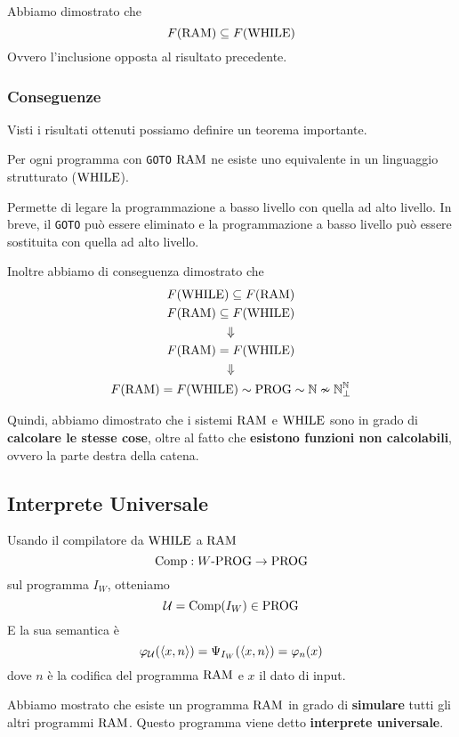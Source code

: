 Abbiamo dimostrato che
$$ F(\text{RAM}) \subseteq F(\text{WHILE}) $$
Ovvero l'inclusione opposta al risultato precedente.

\subsubsection{Conseguenze}

Visti i risultati ottenuti possiamo definire un teorema importante.\\

\begin{theor}
	Per ogni programma con \texttt{GOTO} $\text{RAM}$ ne esiste uno equivalente in un linguaggio strutturato ($\text{WHILE}$).
\end{theor}

Permette di legare la programmazione a basso livello con quella ad alto livello. In breve, il \texttt{GOTO} può essere eliminato e la programmazione a basso livello può essere sostituita con quella ad alto livello.

Inoltre abbiamo di conseguenza dimostrato che
\begin{gather*}
	F(\text{WHILE}) \subseteq F(\text{RAM}) \\
	F (\text{RAM}) \subseteq F(\text{WHILE}) \\
	\Downarrow \\
	F(\text{RAM}) = F(\text{WHILE}) \\
	\Downarrow \\
	F(\text{RAM}) = F(\text{WHILE}) \sim \text{PROG} \sim \mathbb{N} \nsim \mathbb{N}^{\mathbb{N}}_\bot
\end{gather*}

Quindi, abbiamo dimostrato che i sistemi $\text{RAM}$ e $\text{WHILE}$ sono in grado di \textbf{calcolare le stesse cose}, oltre al fatto che \textbf{esistono funzioni non calcolabili}, ovvero la parte destra della catena.

\subsection{Interprete Universale}

Usando il compilatore da $\text{WHILE}$ a $\text{RAM}$
$$ \text{Comp}: W\text{-PROG} \rightarrow \text{PROG} $$
sul programma $I_W$, otteniamo
$$ \mathcal{U} = \text{Comp}(I_W) \in \text{PROG} $$
E la sua semantica è 
$$ \varphi_{\mathcal{U}} (\langle x,n \rangle) = \Psi_{I_W} (\langle x,n \rangle) = \varphi_n (x) $$
dove $n$ è la codifica del programma $\text{RAM}$ e $x$ il dato di input.

Abbiamo mostrato che esiste un programma $\text{RAM}$ in grado di \textbf{simulare} tutti gli altri programmi $\text{RAM}$. Questo programma viene detto \textbf{interprete universale}.

